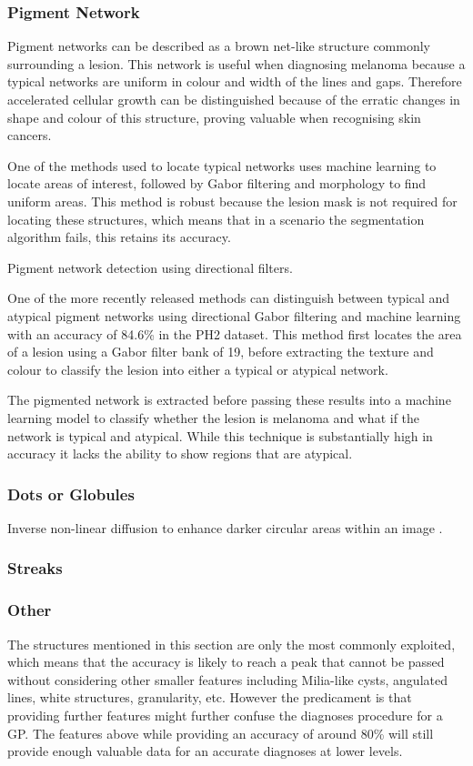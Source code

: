 \documentclass[12pt]{report}
\begin{document}
\subsubsection{Pigment Network}
Pigment networks can be described as a brown net-like structure commonly surrounding a lesion. This network is useful when diagnosing melanoma because a typical networks are uniform in colour and width of the lines and gaps. Therefore accelerated cellular growth can be distinguished because of the erratic changes in shape and colour of this structure, proving valuable when recognising skin cancers.

One of the methods used to locate typical networks uses machine learning to locate areas of interest, followed by Gabor filtering and morphology to find uniform areas\cite{Arroyo2014}. This method is robust because the lesion mask is not required for locating these structures, which means that in a scenario the segmentation algorithm fails, this retains its accuracy.

Pigment network detection using directional filters\cite{Barata2012}.

One of the more recently released methods can distinguish between typical and atypical pigment networks using directional Gabor filtering and machine learning\cite{Pathan2018} with an accuracy of 84.6\% in the PH2 dataset. This method first locates the area of a lesion using a Gabor filter bank of 19, before extracting the texture and colour to classify the lesion into either a typical or atypical network.

The pigmented network is extracted before passing these results into a machine learning model to classify whether the lesion is melanoma and what if the network is typical and atypical. While this technique is substantially high in accuracy it lacks the ability to show regions that are atypical.

\subsubsection{Dots or Globules}
Inverse non-linear diffusion to enhance darker circular areas within an image \cite{I.2015}.

\subsubsection{Streaks}
\cite{Kropidlowski2015}

\subsubsection{Other}
The structures mentioned in this section are only the most commonly exploited, which means that the accuracy is likely to reach a peak that cannot be passed without considering other smaller features including Milia-like cysts, angulated lines, white structures, granularity, etc. However the predicament is that providing further features might further confuse the diagnoses procedure for a GP. The features above while providing an accuracy of around 80\% will still provide enough valuable data for an accurate diagnoses at lower levels.
\end{document}
